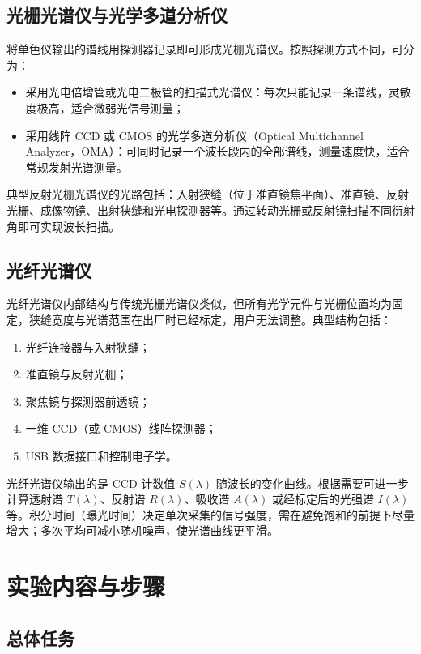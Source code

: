 \documentclass[a4paper,8pt,twocolumn]{article}
\begin{document}
\subsection{光栅光谱仪与光学多道分析仪}

将单色仪输出的谱线用探测器记录即可形成光栅光谱仪。按照探测方式不同，可分为：
\begin{itemize}
  \item 采用光电倍增管或光电二极管的扫描式光谱仪：每次只能记录一条谱线，灵敏度极高，适合微弱光信号测量；
  \item 采用线阵 CCD 或 CMOS 的光学多道分析仪（Optical Multichannel Analyzer，OMA）：可同时记录一个波长段内的全部谱线，测量速度快，适合常规发射光谱测量。
\end{itemize}

典型反射光栅光谱仪的光路包括：入射狭缝（位于准直镜焦平面）、准直镜、反射光栅、成像物镜、出射狭缝和光电探测器等。通过转动光栅或反射镜扫描不同衍射角即可实现波长扫描。

\subsection{光纤光谱仪}

光纤光谱仪内部结构与传统光栅光谱仪类似，但所有光学元件与光栅位置均为固定，狭缝宽度与光谱范围在出厂时已经标定，用户无法调整。典型结构包括：
\begin{enumerate}
  \item 光纤连接器与入射狭缝；
  \item 准直镜与反射光栅；
  \item 聚焦镜与探测器前透镜；
  \item 一维 CCD（或 CMOS）线阵探测器；
  \item USB 数据接口和控制电子学。
\end{enumerate}

光纤光谱仪输出的是 CCD 计数值 $S(\lambda)$ 随波长的变化曲线。根据需要可进一步计算透射谱 $T(\lambda)$、反射谱 $R(\lambda)$、吸收谱 $A(\lambda)$ 或经标定后的光强谱 $I(\lambda)$ 等。积分时间（曝光时间）决定单次采集的信号强度，需在避免饱和的前提下尽量增大；多次平均可减小随机噪声，使光谱曲线更平滑。

\section{实验内容与步骤}

\subsection{总体任务}
\end{document}
